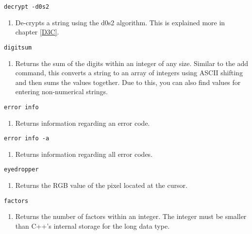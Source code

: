 \begin{lstlisting} 
decrypt -d0s2   
\end{lstlisting}
\begin{enumerate}
	\item[] De-crypts a string using the d0s2 algorithm. This is explained more in chapter \ref{D3C}.
\end{enumerate}

\begin{lstlisting} 
digitsum 
\end{lstlisting}
\begin{enumerate}
	\item[] Returns the sum of the digits within an integer of any size. Similar to the add command, this converts a string to an array of integers using ASCII shifting and then sums the values together. Due to this, you can also find values for entering non-numerical strings.
\end{enumerate}

\begin{lstlisting} 
error info
\end{lstlisting}
\begin{enumerate}
	\item[] Returns information regarding an error code.
\end{enumerate}

\begin{lstlisting} 
error info -a
\end{lstlisting}
\begin{enumerate}
\item[] Returns information regarding all error codes.
\end{enumerate}

\begin{lstlisting} 
eyedropper
\end{lstlisting}
\begin{enumerate}
	\item[] Returns the RGB value of the pixel located at the cursor.
\end{enumerate}

\begin{lstlisting} 
factors   
\end{lstlisting}
\begin{enumerate}
	\item[] Returns the number of factors within an integer. The integer must be smaller than C++'s internal storage for the long data type.
\end{enumerate}

